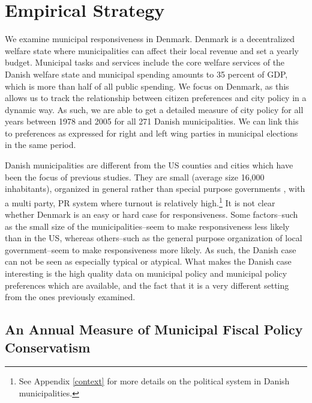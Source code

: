 \documentclass[a4paper,12pt]{article}
\begin{document}
\section*{Empirical Strategy}

 We examine municipal responsiveness in Denmark. Denmark is a decentralized welfare state where municipalities can affect their local revenue and set a yearly budget.  Municipal tasks and services include the core welfare services of the Danish welfare state and municipal spending amounts to 35 percent of GDP, which is more than half of all public spending. We focus on Denmark, as this allows us to track the relationship between citizen preferences and city policy in a dynamic way. As such, we are able to get a detailed measure of city policy for all years between 1978 and 2005 for all 271 Danish municipalities.  We can link this to preferences as expressed for right and left wing parties in municipal elections in the same period.
 
 

Danish municipalities are different from the US counties and cities which have been the focus of previous studies. They are small (average size 16,000 inhabitants), organized in general rather than special purpose governments \citep{berry2009imperfect}, with a multi party, PR system where turnout is relatively high.\footnote{See Appendix \ref{context} for more details on the political system in Danish municipalities.} It is not clear whether Denmark is an easy or hard case for responsiveness.  Some factors--such as the small size of the municipalities--seem to make responsiveness less likely than in the US, whereas others--such as the general purpose organization of local government--seem to make responsiveness more likely. As such, the Danish case can not be seen as especially typical or atypical. What makes the Danish case interesting is the high quality data on municipal policy and municipal policy preferences which are available, and the fact that it is a very different setting from the ones previously examined.


\subsection*{An Annual Measure of Municipal Fiscal Policy Conservatism}
\end{document}
